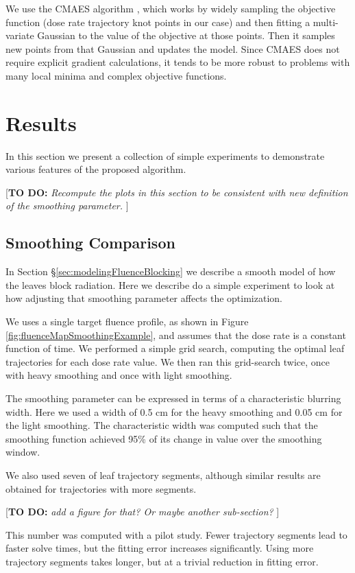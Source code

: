 \documentclass[12pt]{article}
\newcommand{\todo}[1]{{\color{lightblue}\par {[{\bf TO DO: } {\em #1}} ] \\    }}
\begin{document}
We use the CMAES algorithm \cite{Hansen2001}, which
works by widely sampling the objective function (dose rate trajectory knot points in our case) and then fitting a multi-variate Gaussian to the value of the objective at those points.
Then it samples new points from that Gaussian and updates the model.
Since CMAES does not require explicit gradient calculations, it tends to be more robust to problems
with many local minima and complex objective functions.


\section{Results}

In this section we present a collection of simple experiments to demonstrate various features of the
proposed algorithm.

\todo{Recompute the plots in this section to be consistent with new definition of the smoothing
      parameter.}

\subsection{Smoothing Comparison}
\label{sec:LeafSmoothingComparison}

In Section \S\ref{sec:modelingFluenceBlocking} we describe a smooth model of how the leaves block radiation.
Here we describe do a simple experiment to look at how adjusting that smoothing parameter affects the optimization.

We uses a single target fluence profile, as shown in Figure \ref{fig:fluenceMapSmoothingExample},
and assumes that the dose rate is a constant function of time.
We performed a simple grid search, computing the optimal leaf trajectories for each dose rate value.
We then ran this grid-search twice, once with heavy smoothing and once with light smoothing.

The smoothing parameter can be expressed in terms of a characteristic blurring width.
Here we used a width of 0.5 cm for the heavy smoothing and 0.05 cm for the light smoothing.
The characteristic width was computed such that the smoothing function achieved 95\% of its
change in value over the smoothing window.

We also used seven of leaf trajectory segments, although similar results are obtained for trajectories with more segments.
\todo{add a figure for that? Or maybe another sub-section?}
This number was computed with a pilot study.
Fewer trajectory segments lead to faster solve times, but the fitting error increases significantly.
Using more trajectory segments takes longer, but at a trivial reduction in fitting error.
\end{document}
